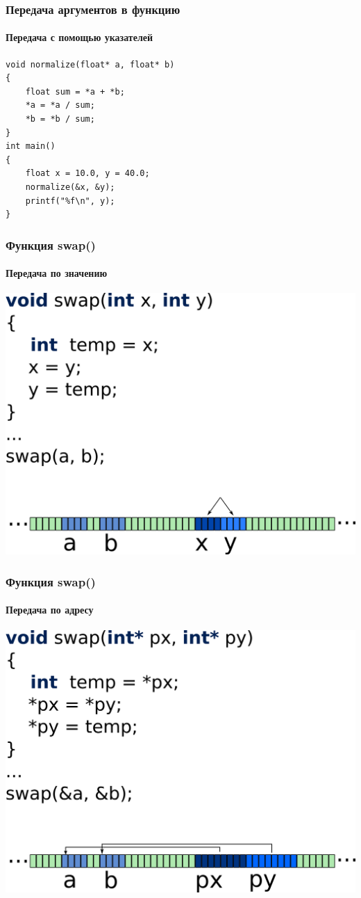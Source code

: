 \documentclass[12pt,pdf,hyperref={unicode}]{beamer}
\begin{document}
\begin{frame}[fragile]
\frametitle{Передача аргументов в функцию}
\framesubtitle{Передача с помощью указателей}
\begin{lstlisting}
void normalize(float* a, float* b)
{
    float sum = *a + *b;
    *a = *a / sum;
    *b = *b / sum;
}
int main()
{
    float x = 10.0, y = 40.0;
    normalize(&x, &y);
    printf("%f\n", y);
}
\end{lstlisting}
\end{frame}


\begin{frame}[fragile]
\frametitle{Функция swap()} 
\framesubtitle{Передача по значению}
\begin{center}
\includegraphics[height=0.55\linewidth]{images/swap_wrong.png}
\end{center}
\end{frame}

\begin{frame}[fragile]
\frametitle{Функция swap()} 
\framesubtitle{Передача по адресу}
\begin{center}
\includegraphics[height=0.55\linewidth]{images/swap_right.png}
\end{center}
\end{frame}
\end{document}
